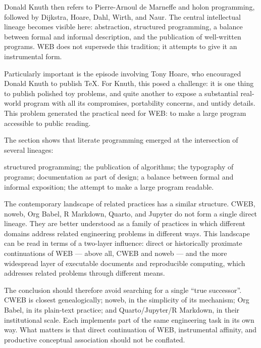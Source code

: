 \documentclass{ZGJournalArticle_2026}
\newenvironment{Shaded}{}{}
\newcommand{\NormalTok}[1]{#1}
\begin{document}
Donald Knuth then refers to Pierre-Arnoul de Marneffe and holon
programming, followed by Dijkstra, Hoare, Dahl, Wirth, and Naur. The
central intellectual lineage becomes visible here: abstraction,
structured programming, a balance between formal and informal
description, and the publication of well-written programs. WEB does not
supersede this tradition; it attempts to give it an instrumental form.

Particularly important is the episode involving Tony Hoare, who
encouraged Donald Knuth to publish TeX. For Knuth, this posed a
challenge: it is one thing to publish polished toy problems, and quite
another to expose a substantial real-world program with all its
compromises, portability concerns, and untidy details. This problem
generated the practical need for WEB: to make a large program accessible
to public reading.

The section shows that literate programming emerged at the intersection
of several lineages:

\begin{Shaded}
\begin{Highlighting}[]
\NormalTok{structured programming;}
\NormalTok{the publication of algorithms;}
\NormalTok{the typography of programs;}
\NormalTok{documentation as part of design;}
\NormalTok{a balance between formal and informal exposition;}
\NormalTok{the attempt to make a large program readable.}
\end{Highlighting}
\end{Shaded}

The contemporary landscape of related practices has a similar structure.
CWEB, noweb, Org Babel, R Markdown, Quarto, and Jupyter do not form a
single direct lineage. They are better understood as a family of
practices in which different domains address related engineering
problems in different ways. This landscape can be read in terms of a
two-layer influence: direct or historically proximate continuations of
WEB --- above all, CWEB and noweb --- and the more widespread layer of
executable documents and reproducible computing, which addresses related
problems through different means.

The conclusion should therefore avoid searching for a single ``true
successor''. CWEB is closest genealogically; noweb, in the simplicity of
its mechanism; Org Babel, in its plain-text practice; and
Quarto/Jupyter/R Markdown, in their institutional scale. Each implements
part of the same engineering task in its own way. What matters is that
direct continuation of WEB, instrumental affinity, and productive
conceptual association should not be conflated.
\end{document}
